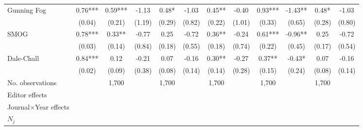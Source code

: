 \begin{sidewaystable}
\begin{threeparttable}
\begin{tabular}{p{3cm}S@{}S@{}S@{}S@{}S@{}S@{}S@{}S@{}S@{}S@{}S@{}}
            Gunning Fog                   &        0.76***&        0.59***&       -1.13   &        0.48*  &       -1.03   &        0.45** &       -0.40   &        0.93***&       -1.43** &        0.48*  &       -1.03   \\
                                          &      (0.04)   &      (0.21)   &      (1.19)   &      (0.29)   &      (0.82)   &      (0.22)   &      (1.01)   &      (0.33)   &      (0.65)   &      (0.28)   &      (0.80)   \\
            SMOG                          &        0.78***&        0.33** &       -0.77   &        0.25   &       -0.72   &        0.36** &       -0.24   &        0.61***&       -0.96** &        0.25   &       -0.72   \\
                                          &      (0.03)   &      (0.14)   &      (0.84)   &      (0.18)   &      (0.55)   &      (0.18)   &      (0.74)   &      (0.22)   &      (0.45)   &      (0.17)   &      (0.54)   \\
            Dale-Chall                    &        0.84***&        0.12   &       -0.21   &        0.07   &       -0.16   &        0.30** &       -0.27   &        0.37** &       -0.43*  &        0.07   &       -0.16   \\
                                          &      (0.02)   &      (0.09)   &      (0.38)   &      (0.08)   &      (0.14)   &      (0.14)   &      (0.28)   &      (0.15)   &      (0.24)   &      (0.08)   &      (0.14)   \\
            \midrule
            No. observations              &               &       1,700   &               &       1,700   &               &       1,700   &               &       1,700   &               &       1,700   &               \\
            \midrule
            Editor effects       &               &           {}   &               &           {}   &               &           {}   &               &           {}   &               &               &               \\
            Journal\(\times\)Year effects          &               &           {}   &               &           {}   &               &           {}   &               &           {}   &               &               &               \\
            \(N_j\)                       &               &           {}   &               &           {}   &               &           {}   &               &           {}   &               &               &               \\

\end{tabular}
\end{threeparttable}
\end{sidewaystable}
